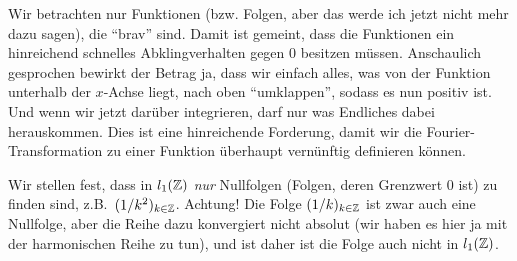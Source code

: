 \begin{remark}
Wir betrachten nur Funktionen (bzw. Folgen, aber das werde ich jetzt nicht mehr dazu 
sagen), die \enquote{brav} sind. Damit ist gemeint, dass die Funktionen ein hinreichend schnelles 
Abklingverhalten gegen $ 0 $ besitzen müssen. Anschaulich gesprochen bewirkt der Betrag ja, dass 
wir einfach alles, was von der Funktion unterhalb der $ x $-Achse liegt, nach oben 
\enquote{umklappen}, sodass es nun positiv ist. Und wenn wir jetzt darüber integrieren, darf nur 
was Endliches dabei herauskommen. Dies ist eine hinreichende Forderung, damit wir die 
Fourier-Transformation zu einer Funktion überhaupt vernünftig definieren können.

Wir stellen fest, dass in $ l_{1}(\mathbb{Z}) $ \emph{nur} Nullfolgen (Folgen, deren
Grenzwert $ 0 $ ist) zu finden sind, z.B.\ $ (1 / k^2)_{k \in \mathbb{Z}} $. Achtung! Die Folge 
$ (1 / k)_{k \in \mathbb{Z}} $ ist zwar auch eine Nullfolge, aber die Reihe dazu konvergiert nicht 
absolut (wir haben es hier ja mit der harmonischen Reihe zu tun), und ist daher ist die Folge auch 
nicht in $ l_{1}(\mathbb{Z}) $.
\end{remark}

